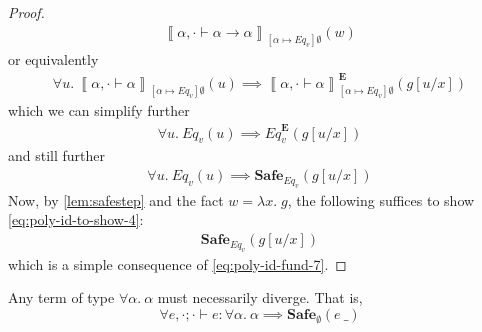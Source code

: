 \documentclass{article}
\newcommand{\semtyp}[3]{\left\llbracket #2 \vdash #3 \right\rrbracket_{#1}}
\newcommand{\semErel}[1]{#1^{\textbf{E}}}
\newcommand{\TArg}{\_}
\newcommand{\expr}{e}
\newcommand{\exprC}{g}
\newcommand{\val}{v}
\newcommand{\valB}{w}
\newcommand{\valC}{u}
\newcommand{\var}{x}
\newcommand{\tvar}{\alpha}
\newcommand{\typed}[4]{#1; #2 \vdash #3 : #4}
\newcommand{\Safe}[1]{\textbf{Safe}_{#1}}
\begin{document}
\begin{proof}
\begin{align}
  \semtyp{[\tvar \mapsto \mathit{Eq}_{\val}]\emptyset}{\tvar, \cdot}{\tvar \to \tvar}(\valB)
\end{align}
or equivalently
\begin{align}
  \label{eq:poly-id-fund-5}
  \forall \valC.~\semtyp{[\tvar \mapsto \mathit{Eq}_{\val}]\emptyset}{\tvar, \cdot}{\tvar}(\valC) \implies \semErel{\semtyp{[\tvar \mapsto \mathit{Eq}_{\val}]\emptyset}{\tvar, \cdot}{\tvar}}(\exprC[\valC/\var])
\end{align}
which we can simplify further
\begin{align}
  \label{eq:poly-id-fund-6}
  \forall \valC.~\mathit{Eq}_{\val}(\valC) \implies \semErel{\mathit{Eq}_{\val}}(\exprC[\valC/\var])
\end{align}
and still further
\begin{align}
  \label{eq:poly-id-fund-7}
  \forall \valC.~\mathit{Eq}_{\val}(\valC) \implies \Safe{\mathit{Eq}_{\val}}(\exprC[\valC/\var])
\end{align}
Now, by \ref{lem:safestep} and the fact $\valB = \lambda \var.\; \exprC$, the following suffices to show \eqref{eq:poly-id-to-show-4}:
\begin{align}
  \label{eq:poly-id-to-show-4}
  \Safe{\mathit{Eq}_{\val}}(\exprC[\valC/\var])
\end{align}
which is a simple consequence of \eqref{eq:poly-id-fund-7}.
\end{proof}

\begin{freetheorem}
Any term of type $\forall \tvar.~\tvar$ must necessarily diverge. That is,
\[
\forall \expr, \typed{\cdot}{\cdot}{\expr}{\forall \tvar.~\tvar} \implies \Safe{\emptyset}(\expr~\TArg)
\]
\end{freetheorem}
\end{document}
